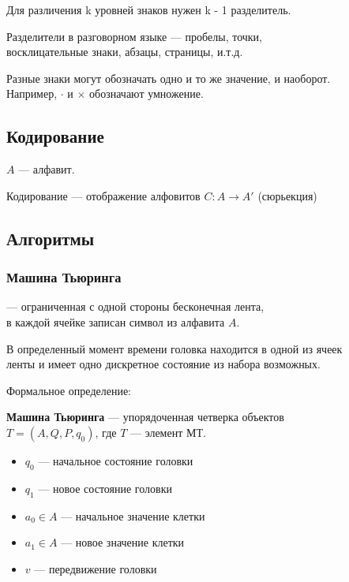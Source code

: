 \documentclass{article}
\begin{document}
Для различения k уровней знаков нужен k - 1 разделитель.

Разделители в разговорном языке --- пробелы, точки, \\
восклицательные знаки, абзацы, страницы, и.т.д.

Разные знаки могут обозначать одно и то же значение, и наоборот.\\
Например, $\cdot$ и $\times$ обозначают умножение.

\subsection{Кодирование}

$A$ --- алфавит.

Кодирование --- отображение алфовитов $C: A \rightarrow A'$ (сюрьекция)

\subsection{Алгоритмы}

\subsubsection{Машина Тьюринга}

--- ограниченная с одной стороны бесконечная лента,\\
в каждой ячейке записан символ из алфавита $A$.

В определенный момент времени головка находится в одной из ячеек\\
ленты и имеет одно дискретное состояние из набора возможных.

Формальное определение:

\textbf{Машина Тьюринга} --- упорядоченная четверка объектов\\
$T = (A, Q, P, q_0)$, где $T$ --- элемент МТ.

\begin{itemize}
	\item $q_0$ --- начальное состояние головки
	\item $q_1$ --- новое состояние головки
	\item $a_0 \in A$ --- начальное значение клетки
	\item $a_1 \in A$ --- новое значение клетки
	\item $v$ --- передвижение головки
\end{itemize}
\end{document}
